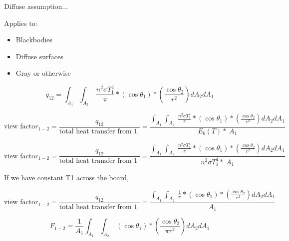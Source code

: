 \documentclass[12pt]{article}
\renewcommand{\_}{\kern-1.5pt\textunderscore\kern-1.5pt}
\begin{document}
\par

Diffuse assumption$ \ldots $ \par

Applies to:\par
\begin{itemize}
	\item Blackbodies\par

	\item Diffuse surfaces\par


	\item Gray or otherwise\par
\end{itemize}


\vspace{\baselineskip}
 \[ q_{12}= \int _{A_{1}}^{} \int _{A_{2}}^{}~\frac{n^{2} \sigma T_{1}^{4}}{ \pi }\ast \left( \cos  \theta _{1} \right) \ast \left( \frac{\cos  \theta _{2}}{r^{2}} \right) dA_{2}dA_{1} \] \par

 \[ \text{view facto}r_{1-2}=\frac{q_{12}}{\text{total heat transfer from 1 }}=\frac{ \int _{A_{1}}^{} \int _{A_{2}}^{}~\frac{n^{2} \sigma T_{1}^{4}}{ \pi }\ast \left( \cos  \theta _{1} \right) \ast \left( \frac{\cos  \theta _{2}}{r^{2}} \right) dA_{2}dA_{1}}{E_{b} \left( T \right) \ast~A_{1}} \] \par

 \[ \text{view facto}r_{1-2}=\frac{q_{12}}{\text{total heat transfer from 1 }}=\frac{ \int _{A_{1}}^{} \int _{A_{2}}^{}~\frac{n^{2} \sigma T_{1}^{4}}{ \pi }\ast \left( \cos  \theta _{1} \right) \ast \left( \frac{\cos  \theta _{2}}{r^{2}} \right) dA_{2}dA_{1}}{n^{2} \sigma T_{1}^{4}\ast~A_{1}} \] \par

If we have constant T1 across the board,\par

 \[ \text{view facto}r_{1-2}=\frac{q_{12}}{\text{total heat transfer from 1 }}=\frac{ \int _{A_{1}}^{} \int _{A_{2}}^{}~\frac{1}{ \pi }\ast \left( \cos  \theta _{1} \right) \ast \left( \frac{\cos  \theta _{2}}{r^{2}} \right) dA_{2}dA_{1}}{A_{1}} \] \par

 \[ F_{1-2}=\frac{1}{A_{1}} \int _{A_{1}}^{} \int _{A_{2}}^{}~ \left( \cos  \theta _{1} \right) \ast \left( \frac{\cos  \theta _{2}}{ \pi r^{2}} \right) dA_{2}dA_{1} \] \par
\end{document}
